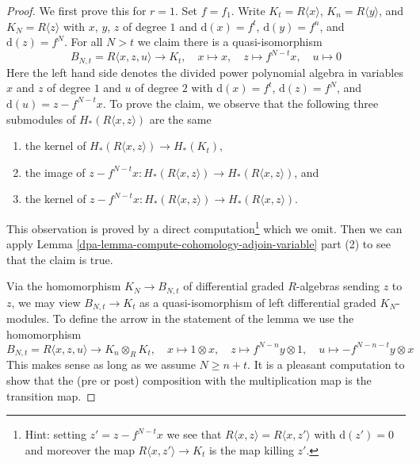 \begin{proof}

We first prove this for $r = 1$. Set $f = f_1$.
Write $K_t = R\langle x \rangle$,
$K_n = R\langle y \rangle$, and $K_N = R\langle z \rangle$
with $x$, $y$, $z$ of degree $1$ and
$\text{d}(x) = f^t$, $\text{d}(y) = f^n$, and
$\text{d}(z) = f^N$. For all $N > t$ we claim there is a quasi-isomorphism
$$
B_{N, t} = R\langle x, z, u \rangle
\longrightarrow
K_t,\quad
x \mapsto x,\quad
z \mapsto f^{N - t}x,\quad
u \mapsto 0
$$
Here the left hand side denotes the divided power polynomial algebra
in variables $x$ and $z$ of degree $1$ and $u$ of degree $2$ with
$\text{d}(x) = f^t$, $\text{d}(z) = f^N$, and
$\text{d}(u) = z - f^{N - t}x$. To prove the claim,
we observe that the following three submodules of
$H_*(R\langle x, z\rangle)$ are the same
\begin{enumerate}
\item the kernel of $H_*(R\langle x, z\rangle) \to H_*(K_t)$,
\item the image of
$z - f^{N - t}x : H_*(R\langle x, z\rangle) \to H_*(R\langle x, z\rangle)$, and
\item the kernel of
$z - f^{N - t}x : H_*(R\langle x, z\rangle) \to H_*(R\langle x, z\rangle)$.
\end{enumerate}
This observation is proved by a direct computation\footnote{Hint: setting
$z' = z - f^{N - t}x$ we see that
$R\langle x, z\rangle = R\langle x, z'\rangle$ with $\text{d}(z') = 0$
and moreover the map $R\langle x, z'\rangle \to K_t$ is
the map killing $z'$.} which we omit. Then we can
apply Lemma \ref{dpa-lemma-compute-cohomology-adjoin-variable} part (2)
to see that the claim is true.

\medskip\noindent
Via the homomorphism $K_N \to B_{N, t}$ of differential graded $R$-algebras
sending $z$ to $z$, we may view $B_{N, t} \to K_t$ as a quasi-isomorphism of
left differential graded $K_N$-modules. To define the arrow in the statement
of the lemma we use the homomorphism
$$
B_{N, t} = R\langle x, z, u \rangle \to K_n \otimes_R K_t,\quad
x \mapsto 1 \otimes x,\quad
z \mapsto f^{N - n}y \otimes 1,\quad
u \mapsto - f^{N - n - t}y \otimes x
$$
This makes sense as long as we assume $N \geq n + t$. It is a
pleasant computation to show that the (pre or post) composition with
the multiplication map is the transition map.


\end{proof}
